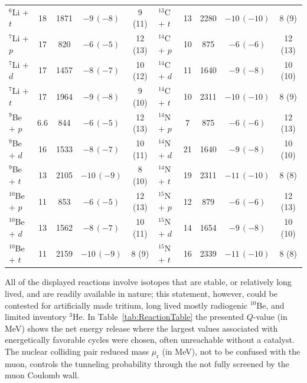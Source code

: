 \documentclass[particles,article,accept,pdftex,moreauthors]{Definitions/mdpi}
\newcommand{\rt}[1]{Table~\ref{#1}}
\begin{document}
\begin{table}[ht]
\begin{tabular*}{\linewidth}{@{\extracolsep{\fill}}lcccc|lcccc@{}}
${}^{6}$Li + $t$ & 18 & 1871 & $-9\,(-8)$ & 9 (11) & ${}^{13}$C + $t$ & 13 & 2280 & $-10\,(-10)$ & 8 (9) \\
${}^{7}$Li + $p$ & 17 & 820 & $-6\,(-5)$ & 12 (13) & ${}^{14}$C + $p$ & 10 & 875 & $-6\,(-6)$ & 12 (13) \\
${}^{7}$Li + $d$ & 17 & 1457 & $-8\,(-7)$ & 10 (12) & ${}^{14}$C + $d$ & 11 & 1640 & $-9\,(-8)$ & 10 (10) \\
${}^{7}$Li + $t$ & 17 & 1964 & $-9\,(-8)$ & 9 (10) & ${}^{14}$C + $t$ & 10 & 2311 & $-10\,(-10)$ & 8 (9) \\
${}^{9}$Be + $p$ & 6.6 & 844 & $-6\,(-5)$ & 12 (13) & ${}^{14}$N + $p$ & 7 & 875 & $-6\,(-6)$ & 12 (13) \\
${}^{9}$Be + $d$ & 16 & 1533 & $-8\,(-7)$ & 10 (11) & ${}^{14}$N + $d$ & 21 & 1640 & $-9\,(-8)$ & 10 (10) \\
${}^{9}$Be + $t$ & 13 & 2105 & $-10\,(-9)$ & 8 (10) & ${}^{14}$N + $t$ & 19 & 2311 & $-11\,(-10)$ & 8 (8) \\
${}^{10}$Be + $p$ & 11 & 853 & $-6\,(-5)$ & 12 (13) & ${}^{15}$N + $p$ & 12 & 879 & $-6\,(-6)$ & 12 (13) \\
${}^{10}$Be + $d$ & 13 & 1562 & $-8\,(-7)$ & 10 (11) & ${}^{15}$N + $d$ & 14 & 1654 & $-9\,(-8)$ & 10 (10) \\
${}^{10}$Be + $t$ & 11 & 2159 & $-10\,(-9)$ & 8 (9) & ${}^{15}$N + $t$ & 16 & 2339 & $-11\,(-10)$ & 8 (8) \\
\bottomrule
\end{tabular*}
\end{table}

All of the displayed reactions involve isotopes that are stable, or relatively long lived, and are readily available in nature; this statement, however, could be contested for artificially made tritium, long lived mostly radiogenic ${}^{10}\mathrm{Be}$, and limited inventory ${}^3\mathrm{He}$. In \rt{tab:ReactionTable} the presented $Q$-value (in MeV) shows the net energy release where the largest values associated with energetically favorable cycles were chosen, often unreachable without a catalyst. The nuclear colliding pair reduced mass $\mu_\mathrm{r}$ (in MeV), not to be confused with the muon, controls the tunneling probability through the not fully screened by the muon Coulomb wall.
\end{document}

